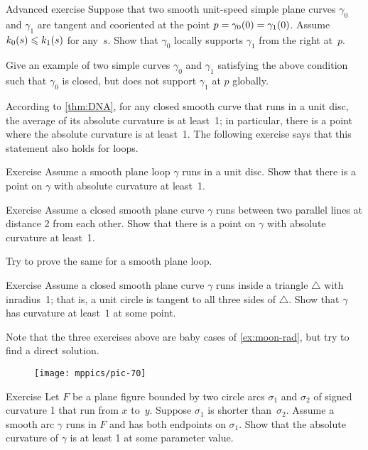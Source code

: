 \begin{thm}{Advanced exercise}\label{ex:support}
Suppose that two smooth unit-speed simple plane curves $\gamma_0$ and $\gamma_1$ are tangent and cooriented at the point $p\z=\gamma_0(0)\z=\gamma_1(0)$.
Assume $k_0(s)\leqslant k_1(s)$ for any~$s$.
Show that $\gamma_0$ locally supports $\gamma_1$ from the right at~$p$.

Give an example of two simple curves $\gamma_0$ and $\gamma_1$ satisfying the above condition such that $\gamma_0$ is closed, but does not support $\gamma_1$ at $p$ globally.
\end{thm}

According to \ref{thm:DNA}, for any closed smooth curve that runs in a unit disc, the average of its absolute curvature is at least~1; in particular, there is a point where the absolute curvature is at least~1.
The following exercise says that this statement also holds for loops.

\begin{thm}{Exercise}\label{ex:in-circle}
Assume a smooth plane loop $\gamma$ runs in a unit disc.
Show that there is a point on $\gamma$ with absolute curvature at least~1.
\end{thm}


\begin{thm}{Exercise}\label{ex:between-parallels-1}
Assume a closed smooth plane curve $\gamma$ runs between two parallel lines at distance 2 from each other.
Show that there is a point on $\gamma$ with absolute curvature at least~1.

Try to prove the same for a smooth plane loop.
\end{thm}

\begin{thm}{Exercise}\label{ex:in-triangle}
Assume a closed smooth plane curve $\gamma$ runs inside a triangle $\triangle$ with inradius~1; that is, a unit circle is tangent to all three sides of $\triangle$. 
Show that $\gamma$ has curvature at least~$1$ at some point.
\end{thm}

Note that the three exercises above are baby cases of \ref{ex:moon-rad}, but try to find a direct solution.

{

\begin{wrapfigure}{r}{32 mm}
\vskip-4mm
\centering
\texttt{[image: mppics/pic-70]}
\vskip0mm
\end{wrapfigure}

\begin{thm}{Exercise}\label{ex:lens}
Let $F$ be a plane figure bounded by two circle arcs $\sigma_1$ and $\sigma_2$ of signed curvature 1 that run from $x$ to~$y$.
Suppose $\sigma_1$ is shorter than~$\sigma_2$.
Assume a smooth arc $\gamma$ runs in $F$ and has both endpoints on $\sigma_1$.
Show that the absolute curvature of $\gamma$ is at least 1 at some parameter value.

\end{thm}

}

